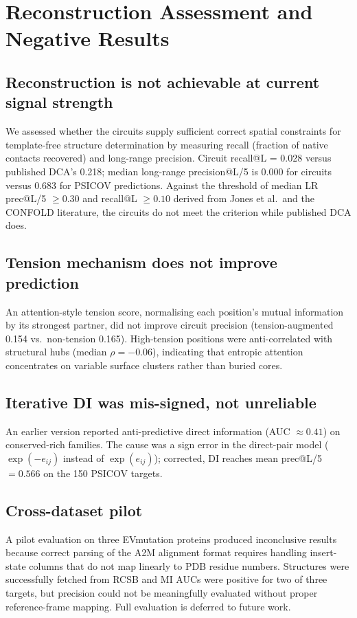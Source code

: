 \section{Reconstruction Assessment and Negative Results}
\label{sec:res-reconstruction-negative}

\subsection{Reconstruction is not achievable at current signal strength}
We assessed whether the circuits supply sufficient correct spatial constraints
for template-free structure determination by measuring recall (fraction of
native contacts recovered) and long-range precision.  Circuit recall@L = 0.028
versus published DCA's 0.218; median long-range precision@L/5 is 0.000 for
circuits versus 0.683 for PSICOV predictions.  Against the threshold of
median LR prec@L/5 $\geq 0.30$ and recall@L $\geq 0.10$ derived from
Jones et al.\ and the CONFOLD literature, the circuits do not meet the
criterion while published DCA does.

\subsection{Tension mechanism does not improve prediction}
An attention-style tension score, normalising each position's mutual
information by its strongest partner, did not improve circuit precision
(tension-augmented 0.154 vs.\ non-tension 0.165).  High-tension positions were
anti-correlated with structural hubs (median $\rho = -0.06$), indicating that
entropic attention concentrates on variable surface clusters rather than
buried cores.

\subsection{Iterative DI was mis-signed, not unreliable}
An earlier version reported anti-predictive direct information (AUC
$\approx 0.41$) on conserved-rich families.  The cause was a sign error in
the direct-pair model ($\exp(-e_{ij})$ instead of $\exp(e_{ij})$); corrected,
DI reaches mean prec@L/5 $= 0.566$ on the 150 PSICOV targets.

\subsection{Cross-dataset pilot}
A pilot evaluation on three EVmutation proteins produced inconclusive results
because correct parsing of the A2M alignment format requires handling
insert-state columns that do not map linearly to PDB residue numbers.
Structures were successfully fetched from RCSB and MI AUCs were positive for
two of three targets, but precision could not be meaningfully evaluated
without proper reference-frame mapping.  Full evaluation is deferred to
future work.
